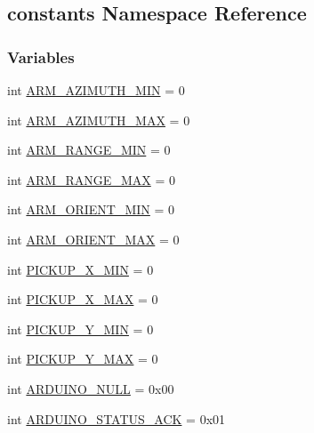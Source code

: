 \hypertarget{namespaceconstants}{}\subsection{constants Namespace Reference}
\label{namespaceconstants}
\subsubsection*{Variables}
\begin{DoxyCompactItemize}
\item 
int \mbox{\hyperlink{namespaceconstants_a8112376fe415e03687dcfcf32508ff5b}{A\+R\+M\+\_\+\+A\+Z\+I\+M\+U\+T\+H\+\_\+\+M\+IN}} = 0
\item 
int \mbox{\hyperlink{namespaceconstants_a32e0792803d2cda1bfc22b90f37f3e3d}{A\+R\+M\+\_\+\+A\+Z\+I\+M\+U\+T\+H\+\_\+\+M\+AX}} = 0
\item 
int \mbox{\hyperlink{namespaceconstants_a185349fe1a4462c42310332cc79acacb}{A\+R\+M\+\_\+\+R\+A\+N\+G\+E\+\_\+\+M\+IN}} = 0
\item 
int \mbox{\hyperlink{namespaceconstants_ac7dbe3d17e1603a0dec2f32acb4adb29}{A\+R\+M\+\_\+\+R\+A\+N\+G\+E\+\_\+\+M\+AX}} = 0
\item 
int \mbox{\hyperlink{namespaceconstants_a04a3b80c0f1a2b5dbb41e8e67d1388ff}{A\+R\+M\+\_\+\+O\+R\+I\+E\+N\+T\+\_\+\+M\+IN}} = 0
\item 
int \mbox{\hyperlink{namespaceconstants_a8d807b2016ecbfc6475116fd0a076e71}{A\+R\+M\+\_\+\+O\+R\+I\+E\+N\+T\+\_\+\+M\+AX}} = 0
\item 
int \mbox{\hyperlink{namespaceconstants_a3665696f70f5b437797e0d13d110420c}{P\+I\+C\+K\+U\+P\+\_\+\+X\+\_\+\+M\+IN}} = 0
\item 
int \mbox{\hyperlink{namespaceconstants_a9ee9486608b258c0590c50f4ede72be5}{P\+I\+C\+K\+U\+P\+\_\+\+X\+\_\+\+M\+AX}} = 0
\item 
int \mbox{\hyperlink{namespaceconstants_af4d50d2aff64fadb62d4a0320240ac84}{P\+I\+C\+K\+U\+P\+\_\+\+Y\+\_\+\+M\+IN}} = 0
\item 
int \mbox{\hyperlink{namespaceconstants_aff4644fbe2c3332f95ddce3081cc34ca}{P\+I\+C\+K\+U\+P\+\_\+\+Y\+\_\+\+M\+AX}} = 0
\item 
int \mbox{\hyperlink{namespaceconstants_a4fc285d2a763b856a59abf7415a88f39}{A\+R\+D\+U\+I\+N\+O\+\_\+\+N\+U\+LL}} = 0x00
\item 
int \mbox{\hyperlink{namespaceconstants_a1457f970f66c031b379dac8ef6d7e131}{A\+R\+D\+U\+I\+N\+O\+\_\+\+S\+T\+A\+T\+U\+S\+\_\+\+A\+CK}} = 0x01

\end{DoxyCompactItemize}
